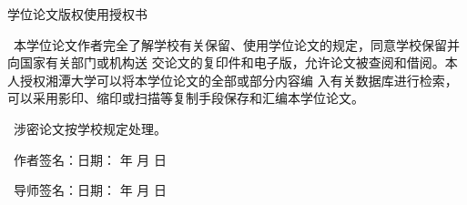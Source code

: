 \vskip 50mm
\begin{center}
    {\heiti \erhao 学位论文版权使用授权书}
\end{center}
\songti\sihao
\par
    ~本学位论文作者完全了解学校有关保留、使用学位论文的规定，同意学校保留并向国家有关部门或机构送
交论文的复印件和电子版，允许论文被查阅和借阅。本人授权湘潭大学可以将本学位论文的全部或部分内容编
入有关数据库进行检索，可以采用影印、缩印或扫描等复制手段保存和汇编本学位论文。
\par
    ~涉密论文按学校规定处理。
\vskip 10mm
\par
    ~作者签名：\hfill                         日期：\kern 1.6cm 年 \kern 0.8cm 月 \kern 0.8cm 日
\vskip 10mm
\par
    ~导师签名：\hfill                         日期：\kern 1.6cm 年 \kern 0.8cm 月 \kern 0.8cm 日
